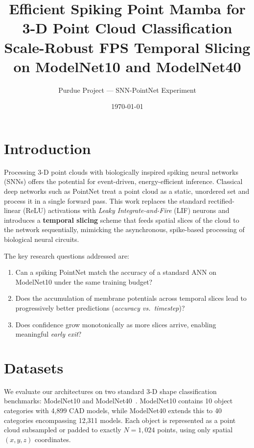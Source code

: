 \documentclass[11pt,a4paper]{article}
\title{%
  \textbf{Efficient Spiking Point Mamba for 3-D Point Cloud Classification}\\[4pt]
  \large Scale-Robust FPS Temporal Slicing on ModelNet10 and ModelNet40
}
\author{Purdue Project --- SNN-PointNet Experiment}
\date{\today}
\begin{document}
\maketitle
\tableofcontents
\clearpage

\section{Introduction}

Processing 3-D point clouds with biologically inspired spiking neural networks
(SNNs) offers the potential for event-driven, energy-efficient inference.
Classical deep networks such as PointNet treat a point cloud as a static,
unordered set and process it in a single forward pass.
This work replaces the standard rectified-linear (ReLU) activations with
\emph{Leaky Integrate-and-Fire} (LIF) neurons and introduces a
\textbf{temporal slicing} scheme that feeds spatial slices of the cloud to the
network sequentially, mimicking the asynchronous, spike-based processing of
biological neural circuits.

The key research questions addressed are:

\begin{enumerate}[leftmargin=1.5cm]
  \item Can a spiking PointNet match the accuracy of a standard ANN on
        ModelNet10 under the same training budget?
  \item Does the accumulation of membrane potentials across temporal slices
        lead to progressively better predictions (\emph{accuracy vs.\
        timestep})?
  \item Does confidence grow monotonically as more slices arrive, enabling
        meaningful \emph{early exit}?
\end{enumerate}

\section{Datasets}

We evaluate our architectures on two standard 3-D shape classification benchmarks:
ModelNet10 and ModelNet40~\cite{wu20153d}. ModelNet10 contains 10 object
categories with 4{,}899 CAD models, while ModelNet40 extends this to 40
categories encompassing 12{,}311 models. Each object is represented as a
point cloud subsampled or padded to exactly $N = 1{,}024$ points, using only
spatial $(x, y, z)$ coordinates.
\end{document}
